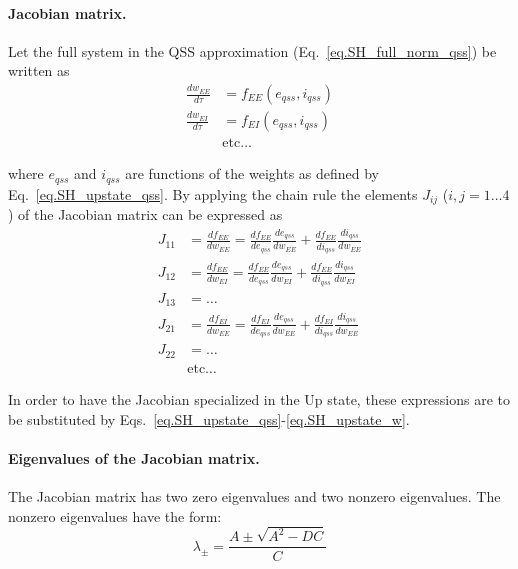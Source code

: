 \documentclass[twocolumn]{article}
\newcommand{\EE}{\mathit{EE}}
\newcommand{\EI}{\mathit{EI}}
\newcommand{\qss}{\mathit{qss}}
\begin{document}
\paragraph{Jacobian matrix.}

Let the full system in the QSS approximation (Eq.\ \ref{eq.SH_full_norm_qss}) be written as
\begin{displaymath}
\begin{aligned}
\frac{dw_{\EE}}{d\tau} & = f_{\EE}(e_{\qss},i_{\qss}) \\
\frac{dw_{\EI}}{d\tau} & = f_{\EI}(e_{\qss},i_{\qss}) \\
& \mbox{etc}\ldots
\end{aligned}
\end{displaymath}

\noindent where $e_{\qss}$ and $i_{\qss}$ are functions of the weights as defined by Eq.\ \ref{eq.SH_upstate_qss}. By applying the chain rule the elements $J_{ij}$ ($i,j=1\ldots4$) of the Jacobian matrix can be expressed as
\begin{displaymath}
\begin{aligned}
J_{11} & = \frac{df_{\EE}}{dw_{\EE}} = \frac{df_{\EE}}{de_{\qss}} \frac{de_{\qss}}{dw_{\EE}} + \frac{df_{\EE}}{di_{\qss}} \frac{di_{\qss}}{dw_{\EE}} \\
J_{12} & = \frac{df_{\EE}}{dw_{\EI}} = \frac{df_{\EE}}{de_{\qss}} \frac{de_{\qss}}{dw_{\EI}} + \frac{df_{\EE}}{di_{\qss}} \frac{di_{\qss}}{dw_{\EI}} \\
J_{13} & = \ldots \\
J_{21} & = \frac{df_{\EI}}{dw_{\EE}} = \frac{df_{\EI}}{de_{\qss}} \frac{de_{\qss}}{dw_{\EE}} + \frac{df_{\EI}}{di_{\qss}} \frac{di_{\qss}}{dw_{\EE}} \\
J_{22} & = \ldots \\
& \mbox{etc}\ldots
\end{aligned}
\end{displaymath}

In order to have the Jacobian specialized in the Up state, these expressions are to be substituted by Eqs.\ \ref{eq.SH_upstate_qss}-\ref{eq.SH_upstate_w}.



\paragraph{Eigenvalues of the Jacobian matrix.}

The Jacobian matrix has two zero eigenvalues and two nonzero eigenvalues. The nonzero eigenvalues have the form:
\begin{equation}
\lambda_{\pm} = \frac{A \pm \sqrt{A^2 - DC}}{C}
\label{eq.SH_eigvals}
\end{equation}
\end{document}
